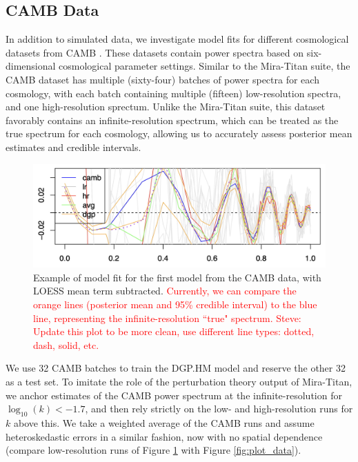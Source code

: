 \documentclass[11pt]{article}
\begin{document}
\subsection{CAMB Data}
\label{subsec:camb}

In addition to simulated data, we investigate model fits for different cosmological 
datasets from CAMB \citep{lewis2011CAMB}. These datasets contain power spectra based
on six-dimensional cosmological parameter settings. Similar to the Mira-Titan suite, the
CAMB dataset has multiple (sixty-four) batches of power spectra for each cosmology, with each batch 
containing multiple (fifteen) low-resolution spectra, and one high-resolution sprectum. 
Unlike the Mira-Titan suite, this dataset favorably contains an infinite-resolution 
spectrum, which can be treated as the true spectrum for each cosmology,
allowing us to accurately assess posterior mean estimates and credible intervals. 

\begin{figure}
    \centering
    \includegraphics[width=6in]{CAMB_fit_model1.jpg}
    \caption{Example of model fit for the first model from the CAMB data, with LOESS
             mean term subtracted. \textcolor{red}{Currently, we can compare the 
             orange lines (posterior mean and 95\% credible interval) to the blue line,
             representing the infinite-resolution ``true" spectrum. Steve: Update this plot to be
             more clean, use different line types: dotted, dash, solid, etc.}}   
    \label{fig:fit_camb}
\end{figure}

We use 32 CAMB batches to train the DGP.HM model and reserve the other 32 as a test set.
To imitate the role of the perturbation theory output of Mira-Titan, we anchor estimates of the CAMB
power spectrum at the infinite-resolution for $\log_{10}(k) < -1.7$, and then rely 
strictly on the low- and high-resolution runs for $k$ above this. We take a weighted
average of the CAMB runs and assume heteroskedastic errors in a similar fashion, now with
no spatial dependence (compare low-resolution runs of Figure \ref{fig:fit_camb} 
with Figure \ref{fig:plot_data}).
\end{document}
